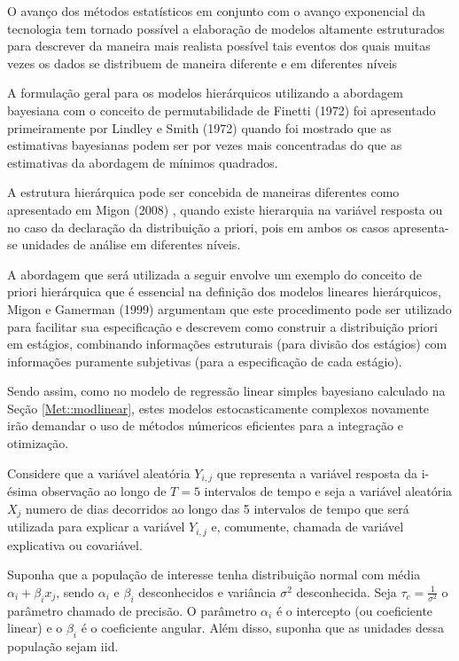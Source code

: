 \documentclass[12pt,a4paper,header]{abnt}
\begin{document}
O avanço dos métodos estatísticos em conjunto com o avanço exponencial da tecnologia tem  tornado possível a elaboração de modelos altamente estruturados para descrever da maneira mais realista possível tais eventos dos quais muitas vezes os dados se distribuem de maneira diferente e em diferentes níveis

A formulação geral para os modelos hierárquicos utilizando a abordagem bayesiana com o conceito de permutabilidade de Finetti (1972) foi apresentado primeiramente por Lindley e Smith (1972) \cite{LindleySmith} quando foi mostrado que as estimativas bayesianas podem ser por vezes mais concentradas do que as estimativas da abordagem de mínimos quadrados.

A estrutura hierárquica pode ser concebida de maneiras diferentes como apresentado em Migon (2008) \cite{MigonMH}, quando existe hierarquia na variável resposta ou no caso da declaração da distribuição a priori, pois em ambos os casos apresenta-se unidades de análise em diferentes níveis.

A abordagem que será utilizada a seguir envolve um exemplo do conceito de priori hierárquica que é essencial na definição dos modelos lineares hierárquicos, Migon e Gamerman (1999) \cite{MigonMH} argumentam que este procedimento pode ser utilizado para facilitar sua especificação e descrevem como construir a distribuição priori em estágios, combinando informações estruturais (para divisão dos estágios) com informações puramente subjetivas (para a especificação de cada estágio).

Sendo assim, como no modelo de regressão linear simples bayesiano calculado na Seção \ref{Met::modlinear}, estes modelos estocasticamente complexos novamente irão demandar o uso de métodos númericos eficientes para a integração e otimização.

Considere que a variável aleatória $Y_{i,j}$ que representa a variável resposta da i-ésima observação ao longo de $T=5$ intervalos de tempo e seja a variável aleatória $X_j$ numero de dias decorridos ao longo das 5 intervalos de tempo que será utilizada para explicar a variável $Y_{i,j}$ e, comumente, chamada de variável explicativa ou covariável.

Suponha que a população de interesse tenha distribuição normal com média $\alpha_i +\beta_i x_j$, sendo $\alpha_i$ e $\beta_i$ desconhecidos e variância $\sigma^2$ desconhecida. Seja $\tau_c=\frac{1}{\sigma^2}$ o parâmetro chamado de precisão. O parâmetro $\alpha_i$ é o intercepto (ou coeficiente linear) e o $\beta_i$ é o coeficiente angular. Além disso, suponha que as unidades dessa população sejam \ac{iid}.
\end{document}
